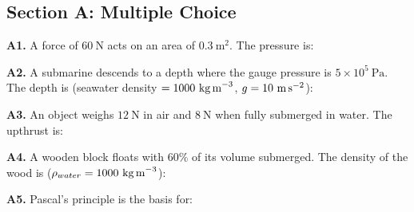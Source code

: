 \newpage
\begin{exercisebox}[11]

\subsection*{Section A: Multiple Choice}

\textbf{A1.} A force of $60\ \text{N}$ acts on an
area of $0.3\ \text{m}^2$. The pressure is:


\vspace{0.4cm}

\textbf{A2.} A submarine descends to a depth where
the gauge pressure is $5\times10^5\ \text{Pa}$.
The depth is (seawater density $= 1000\ \text{kg\,m}^{-3}$,
$g = 10\ \text{m\,s}^{-2}$):


\vspace{0.4cm}

\textbf{A3.} An object weighs $12\ \text{N}$ in air
and $8\ \text{N}$ when fully submerged in water.
The upthrust is:


\vspace{0.4cm}

\textbf{A4.} A wooden block floats with $60\%$ of
its volume submerged. The density of the wood is
($\rho_{water} = 1000\ \text{kg\,m}^{-3}$):


\vspace{0.4cm}

\textbf{A5.} Pascal's principle is the basis for:


\vspace{0.4cm}


\end{exercisebox}
